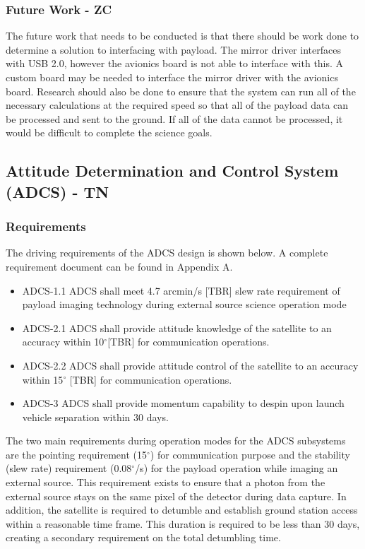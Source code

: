 \documentclass[12pt]{article}
\begin{document}
			\subsubsection{Future Work - ZC}
The future work that needs to be conducted is that there should be work done to determine a solution to interfacing with payload. The mirror driver interfaces with USB 2.0, however the avionics board is not able to interface with this. A custom board may be needed to interface the mirror driver with the avionics board. Research should also be done to ensure that the system can run all of the necessary calculations at the required speed so that all of the payload data can be processed and sent to the ground. If all of the data cannot be processed, it would be difficult to complete the science goals.


\newpage
\FloatBarrier

\subsection{Attitude Determination and Control System (ADCS) - TN} 
			\subsubsection{Requirements}
			The driving requirements of the ADCS design is shown below. A complete requirement document can be found in Appendix A. 
					\begin{itemize}
					\item ADCS-1.1 ADCS shall meet 4.7 arcmin/s [TBR] slew rate requirement of payload imaging technology during external source science operation mode
					\item ADCS-2.1 ADCS shall provide attitude knowledge of the satellite to an accuracy within 10$^\circ$[TBR]  for communication operations.
					\item ADCS-2.2 ADCS shall provide attitude control of the satellite to an accuracy within 15$^\circ$ [TBR] for communication operations.
					\item ADCS-3 ADCS shall provide momentum capability to despin upon launch vehicle separation within 30 days.
					\end{itemize}
				The two main requirements during operation modes for the ADCS subsystems are the pointing requirement (15$^\circ$) for communication purpose and the stability (slew rate) requirement (0.08$^\circ$/s) for the payload operation while imaging an external source. This requirement exists to ensure that a photon from the external source stays on the same pixel of the detector during data capture. In addition, the satellite is required to detumble and establish ground station access within a reasonable time frame. This duration is required to be less than 30 days, creating a secondary requirement on the total detumbling time. 
\end{document}
